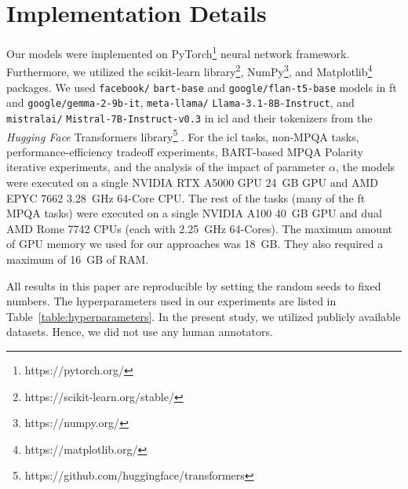\documentclass[11pt]{article}
\theoremstyle{definition}
\begin{document}
\section{Implementation Details}
\label{appendix:expsetup}

Our models were implemented on PyTorch\footnote{https://pytorch.org/} neural network framework.
Furthermore, we utilized the scikit-learn library\footnote{https://scikit-learn.org/stable/},
NumPy\footnote{https://numpy.org/}, and
Matplotlib\footnote{https://matplotlib.org/} packages.
We used \verb|facebook/| \verb|bart-base| and \verb|google/|\verb|flan-t5-base| models in \gls*{ft} and \verb|google/|\verb|gemma-2-9b-it|, \verb|meta-llama/| \verb|Llama-3.1-8B-Instruct|, and \verb|mistralai/| \verb|Mistral-7B-Instruct-v0.3| in \gls*{icl} and their
tokenizers
from the {\em Hugging Face} Transformers library\footnote{https://github.com/huggingface/transformers} \cite{wolf-etal-2020-transformers}.
For the \gls*{icl} tasks, non-MPQA tasks, performance-efficiency tradeoff experiments, BART-based MPQA Polarity iterative experiments, and the analysis of the impact of parameter $\alpha$, the models were executed on a single NVIDIA RTX A5000 GPU 24~GB GPU and AMD EPYC 7662 3.28~GHz 64-Core CPU. 
The rest of the tasks (many of the \gls*{ft} MPQA tasks) were executed on a single NVIDIA A100 40~GB GPU and dual AMD Rome 7742 CPUs (each with 2.25~GHz 64-Cores). The maximum amount of GPU memory we used for our approaches was 18~GB. They also required a maximum of 16~GB of RAM.

\begin{table}[htb]
\centering
{}
\caption{The hyperparameters for BART- and FLAN-T5-based models.}
\label{table:hyperparameters}
\end{table}


All results in this paper are reproducible by setting the random seeds to fixed numbers.
The hyperparameters used in our experiments are listed in Table~\ref{table:hyperparameters}.
In the present study, we utilized publicly available datasets. Hence, we did not use any human annotators.
\end{document}

